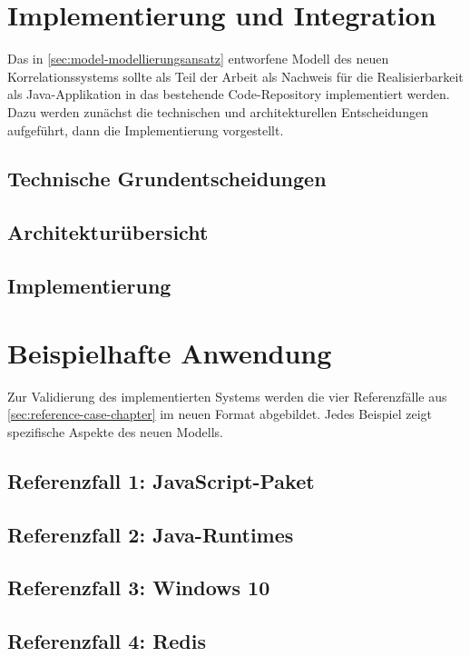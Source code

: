 \section{Implementierung und Integration}\label{sec:implementierung}

Das in \autoref{sec:model-modellierungsansatz} entworfene Modell des neuen Korrelationssystems sollte als Teil der Arbeit als Nachweis für die Realisierbarkeit als Java-Applikation in das bestehende Code-Repository implementiert werden.
Dazu werden zunächst die technischen und architekturellen Entscheidungen aufgeführt, dann die Implementierung vorgestellt.

\subsection{Technische Grundentscheidungen}\label{subsec:impl-tech-choices}

\subsection{Architekturübersicht}\label{subsec:impl-arch-overview}

\subsection{Implementierung}\label{subsec:impl-implementation}


\section{Beispielhafte Anwendung}\label{sec:beispiele-fertige-implementierung}

Zur Validierung des implementierten Systems werden die vier Referenzfälle aus \autoref{sec:reference-case-chapter} im neuen Format abgebildet.
Jedes Beispiel zeigt spezifische Aspekte des neuen Modells.

\subsection{Referenzfall 1: JavaScript-Paket}\label{subsec:example-js-package}

\subsection{Referenzfall 2: Java-Runtimes}\label{subsec:example-java-runtimes}

\subsection{Referenzfall 3: Windows 10}\label{subsec:example-windows}

\subsection{Referenzfall 4: Redis}\label{subsec:example-redis}
